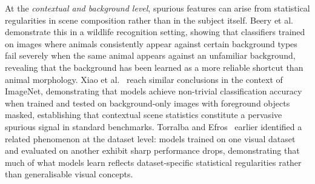 At the \emph{contextual and background level}, spurious features can arise from statistical
regularities in scene composition rather than in the subject itself. Beery et
al.~\cite{Beery_2018_RecognitionTerraIncognita} demonstrate this in a wildlife recognition
setting, showing that classifiers trained on images where animals consistently appear against
certain background types fail severely when the same animal appears against an unfamiliar
background, revealing that the background has been learned as a more reliable shortcut than
animal morphology. Xiao et al.~\cite{Xiao_2021_NoiseOrSignal} reach similar conclusions in
the context of ImageNet, demonstrating that models achieve non-trivial classification
accuracy when trained and tested on background-only images with foreground objects masked,
establishing that contextual scene statistics constitute a pervasive spurious signal in
standard benchmarks. Torralba and Efros~\cite{Torralba_2011_UnbiasedLookDatasetBias} earlier
identified a related phenomenon at the dataset level: models trained on one visual dataset
and evaluated on another exhibit sharp performance drops, demonstrating that much of what
models learn reflects dataset-specific statistical regularities rather than generalisable
visual concepts.


